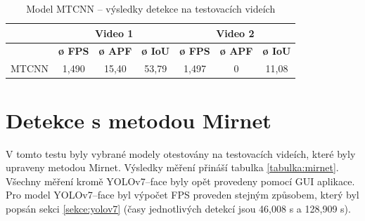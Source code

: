 \begin{table}[H]
  \centering
  \begin{tabular}{c|ccc|ccc|}
  \cline{2-7}
                                                               & \multicolumn{3}{c|}{\cellcolor[HTML]{CBCEFB}\textbf{Video 1}}                                                                              & \multicolumn{3}{c|}{\cellcolor[HTML]{CBCEFB}\textbf{Video 2}}                                                                              \\ \hline
  \rowcolor[HTML]{E0DBDB} 
  \multicolumn{1}{|c|}{\cellcolor[HTML]{E0DBDB}\textbf{Model}} & \multicolumn{1}{c|}{\cellcolor[HTML]{E0DBDB}\textbf{ø FPS}} & \multicolumn{1}{c|}{\cellcolor[HTML]{E0DBDB}\textbf{ø APF}} & \textbf{ø IoU} & \multicolumn{1}{c|}{\cellcolor[HTML]{E0DBDB}\textbf{ø FPS}} & \multicolumn{1}{c|}{\cellcolor[HTML]{E0DBDB}\textbf{ø APF}} & \textbf{ø IoU} \\ \hline
  \multicolumn{1}{|c|}{\cellcolor[HTML]{E0DBDB}MTCNN}          & \multicolumn{1}{c|}{1,490}                                  & \multicolumn{1}{c|}{15,40}                                  & 53,79          & \multicolumn{1}{c|}{1,497}                                  & \multicolumn{1}{c|}{0}                                      & 11,08          \\ \hline
  \end{tabular}
  \label{tabulka:mtcnnvidea}
  \caption{Model MTCNN -- výsledky detekce na testovacích videích}
\end{table}

\section{Detekce s metodou Mirnet}
\label{sekce:mirnetexperimenty}
V tomto testu byly vybrané modely otestovány na testovacích videích, které byly upraveny metodou Mirnet. Výsledky měření přináší tabulka \ref{tabulka:mirnet}. Všechny měření kromě YOLOv7--face byly opět provedeny pomocí GUI aplikace. Pro model YOLOv7--face byl výpočet FPS proveden stejným způsobem, který byl popsán sekci \ref{sekce:yolov7} (časy jednotlivých detekcí jsou 46,008 s a 128,909 s).

